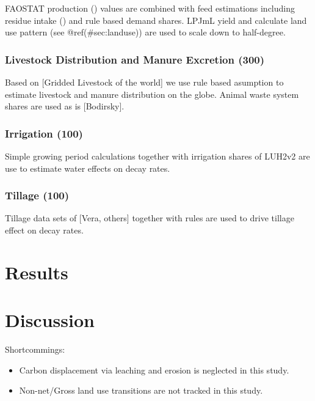 \documentclass[gc, manuscript]{copernicus}
\begin{document}
FAOSTAT production (\citep{FAOSTAT}) values are combined with feed estimations including residue intake (\citep{weindl}) and rule based demand shares. LPJmL yield and calculate land use pattern (see @ref(\#sec:landuse)) are used to scale down to half-degree.

\hypertarget{livestock-distribution-and-manure-excretion-300}{%
\subsubsection{Livestock Distribution and Manure Excretion (300)}\label{livestock-distribution-and-manure-excretion-300}}

Based on {[}Gridded Livestock of the world{]} we use rule based asumption to estimate livestock and manure distribution on the globe. Animal waste system shares are used as is {[}Bodirsky{]}.

\hypertarget{irrigation-100}{%
\subsubsection{Irrigation (100)}\label{irrigation-100}}

Simple growing period calculations together with irrigation shares of LUH2v2 are use to estimate water effects on decay rates.

\hypertarget{tillage-100}{%
\subsubsection{Tillage (100)}\label{tillage-100}}

Tillage data sets of {[}Vera, others{]} together with rules are used to drive tillage effect on decay rates.

\newpage

\hypertarget{results}{%
\section{Results}\label{results}}

\newpage

\hypertarget{discussion}{%
\section{Discussion}\label{discussion}}

Shortcommings:

\begin{itemize}
\item
  Carbon displacement via leaching and erosion is neglected in this study.
\item
  Non-net/Gross land use transitions are not tracked in this study.
  \newpage
\end{itemize}
\end{document}
